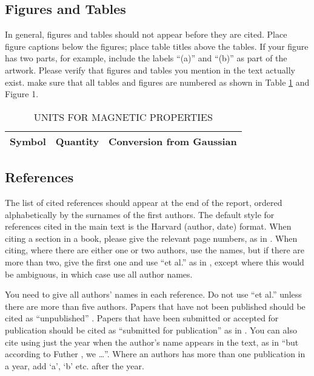 \documentclass[12pt,a4paper]{article}
\begin{document}
\subsection{Figures and Tables}
In general, figures and tables should not appear before they are cited.  Place figure captions below the figures; place table titles above the tables.  If your figure has two parts, for example, include the labels ``(a)'' and ``(b)'' as part of the artwork.  Please verify that figures and tables you mention in the text actually exist.  make sure that all tables and figures are numbered as shown in Table \ref{units} and Figure 1.

\begin{table}[htb]
\centering
\caption{UNITS FOR MAGNETIC PROPERTIES}
\vspace*{6pt}
\label{units}
\begin{tabular}{ccc}\hline\hline
Symbol & Quantity & Conversion from Gaussian \\ \hline
\end{tabular}
\end{table}

\subsection{References}

The list of cited references should appear at the end of the report, ordered alphabetically by the surnames of the first authors.  The default style for references cited in the main text is the  Harvard (author, date) format.  When citing a section in a book, please give the relevant page numbers, as in \cite[p293]{budgen}.  When citing, where there are either one or two authors, use the names, but if there are more than two, give the first one and use ``et al.'' as in  , except where this would be ambiguous, in which case use all author names.

You need to give all authors' names in each reference.  Do not use ``et al.'' unless there are more than five authors.  Papers that have not been published should be cited as ``unpublished'' \cite{euther}.  Papers that have been submitted or accepted for publication should be cited as ``submitted for publication'' as in \cite{futher} .  You can also cite using just the year when the author's name appears in the text, as in ``but according to Futher \citeyear{futher}, we \dots''.  Where an authors has more than one publication in a year, add `a', `b' etc. after the year.





\end{document}
